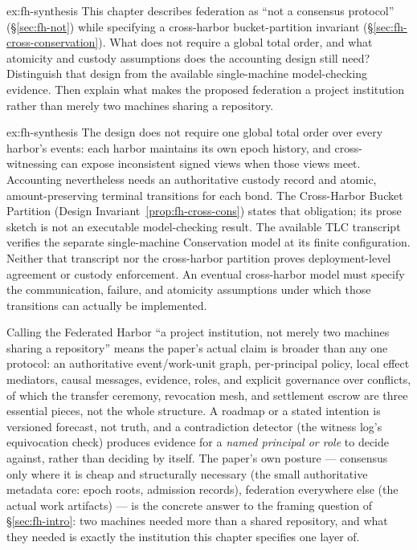 \documentclass[11pt,a4paper]{article}
\theoremstyle{definition}
\theoremstyle{remark}
\begin{document}
\begin{pdexercise}[kind=Open,rating=3]{ex:fh-synthesis}
This chapter describes federation as ``not a consensus protocol'' (\S\ref{sec:fh-not}) while specifying a cross-harbor bucket-partition invariant (\S\ref{sec:fh-cross-conservation}). What does not require a global total order, and what atomicity and custody assumptions does the accounting design still need? Distinguish that design from the available single-machine model-checking evidence. Then explain what makes the proposed federation a project institution rather than merely two machines sharing a repository.
\end{pdexercise}
\begin{pdsolution}{ex:fh-synthesis}
The design does not require one global total order over every harbor's events: each harbor maintains its own epoch history, and cross-witnessing can expose inconsistent signed views when those views meet. Accounting nevertheless needs an authoritative custody record and atomic, amount-preserving terminal transitions for each bond. The Cross-Harbor Bucket Partition (Design Invariant~\ref{prop:fh-cross-cons}) states that obligation; its prose sketch is not an executable model-checking result. The available TLC transcript verifies the separate single-machine Conservation model at its finite configuration. Neither that transcript nor the cross-harbor partition proves deployment-level agreement or custody enforcement. An eventual cross-harbor model must specify the communication, failure, and atomicity assumptions under which those transitions can actually be implemented.

Calling the Federated Harbor ``a project institution, not merely two machines sharing a repository'' means the paper's actual claim is broader than any one protocol: an authoritative event/work-unit graph, per-principal policy, local effect mediators, causal messages, evidence, roles, and explicit governance over conflicts, of which the transfer ceremony, revocation mesh, and settlement escrow are three essential pieces, not the whole structure. A roadmap or a stated intention is versioned forecast, not truth, and a contradiction detector (the witness log's equivocation check) produces evidence for a \emph{named principal or role} to decide against, rather than deciding by itself. The paper's own posture --- consensus only where it is cheap and structurally necessary (the small authoritative metadata core: epoch roots, admission records), federation everywhere else (the actual work artifacts) --- is the concrete answer to the framing question of \S\ref{sec:fh-intro}: two machines needed more than a shared repository, and what they needed is exactly the institution this chapter specifies one layer of.
\end{pdsolution}
\end{document}
